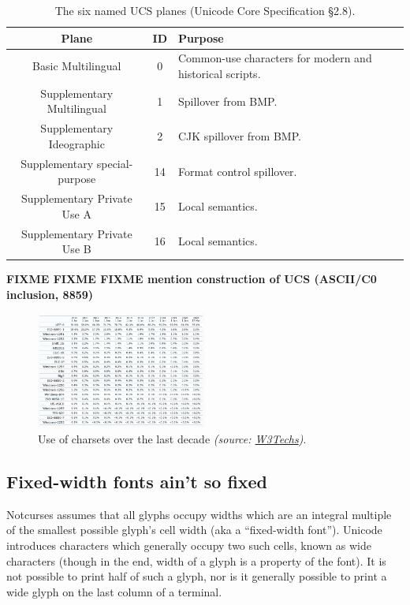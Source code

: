 \begin{table}[!htb]
  \begin{center}
    \begin{tabular}{ |c|c|l| }
      \hline
      Plane & ID & Purpose \\
      \hline
      \hline
      Basic Multilingual & 0 & Common-use characters for modern and historical scripts. \\
      \hline
      Supplementary Multilingual & 1 & Spillover from BMP. \\
      \hline
      Supplementary Ideographic & 2 & CJK spillover from BMP. \\
      \hline
      Supplementary special-purpose & 14 & Format control spillover. \\
      \hline
      Supplementary Private Use A & 15 & Local semantics. \\
      \hline
      Supplementary Private Use B & 16 & Local semantics. \\
      \hline
    \end{tabular}
  \end{center}
  \caption[The six named UCS planes.]{The six named UCS planes (Unicode Core Specification §2.8\cite{unicode}).}
  \label{table:ucsplanes}
\end{table}

\textbf{FIXME FIXME FIXME mention construction of UCS (ASCII/C0 inclusion, 8859)}

\begin{figure}[!htb]
\centering
\includegraphics[width=0.5\textwidth]{media/yearly-charsets.png}
\caption{Use of charsets over the last decade \textit{(source: \href{https://w3techs.com/technologies/history\_overview/character\_encoding/ms/y}{W3Techs})}.}
\label{fig:charsetuse}
\end{figure}

\subsection{Fixed-width fonts ain't so fixed}
Notcurses assumes that all glyphs occupy widths which are an integral multiple
of the smallest possible glyph's cell width (aka a ``fixed-width font'').
Unicode introduces characters which generally occupy two such cells, known as
wide characters (though in the end, width of a glyph is a property of the
font). It is not possible to print half of such a glyph, nor is it generally
possible to print a wide glyph on the last column of a terminal.

